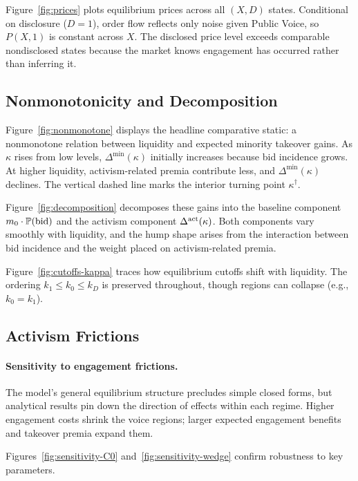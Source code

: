\documentclass[11pt]{article}
\newcommand{\PP}{\mathbb{P}}
\newcommand{\1}{\mathbf{1}}
\begin{document}
Figure~\ref{fig:prices} plots equilibrium prices across all $(X,D)$ states. Conditional on disclosure ($D=1$), order flow reflects only noise given Public Voice, so $P(X,1)$ is constant across $X$. The disclosed price level exceeds comparable nondisclosed states because the market knows engagement has occurred rather than inferring it.

%
\subsection{Nonmonotonicity and Decomposition}
%

Figure~\ref{fig:nonmonotone} displays the headline comparative static: a nonmonotone relation between liquidity and expected minority takeover gains. As $\kappa$ rises from low levels, $\Delta^{\min}(\kappa)$ initially increases because bid incidence grows. At higher liquidity, activism-related premia contribute less, and $\Delta^{\min}(\kappa)$ declines. The vertical dashed line marks the interior turning point $\kappa^{\dagger}$.

Figure~\ref{fig:decomposition} decomposes these gains into the baseline component $m_0 \cdot \PP(\textup{bid})$ and the activism component $\Delta^{\textup{act}}(\kappa)$. Both components vary smoothly with liquidity, and the hump shape arises from the interaction between bid incidence and the weight placed on activism-related premia.

Figure~\ref{fig:cutoffs-kappa} traces how equilibrium cutoffs shift with liquidity. The ordering $k_1 \le k_0 \le k_D$ is preserved throughout, though regions can collapse (e.g., $k_0=k_1$).

%
\subsection{Activism Frictions}
%

\paragraph{Sensitivity to engagement frictions.}
The model's general equilibrium structure precludes simple closed forms, but analytical results pin down the direction of effects within each regime. Higher engagement costs shrink the voice regions; larger expected engagement benefits and takeover premia expand them.

Figures~\ref{fig:sensitivity-C0} and~\ref{fig:sensitivity-wedge} confirm robustness to key parameters.
\end{document}
